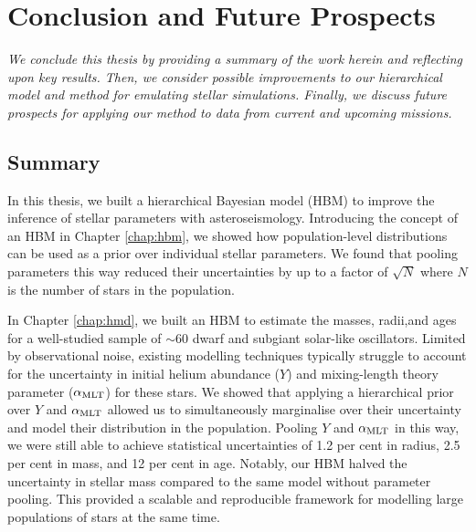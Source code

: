 %
%
%
%
%
\chapter{Conclusion and Future Prospects}

\textit{We conclude this thesis by providing a summary of the work herein and reflecting upon key results. Then, we consider possible improvements to our hierarchical model and method for emulating stellar simulations. Finally, we discuss future prospects for applying our method to data from current and upcoming missions.}

\section*{Summary}

In this thesis, we built a hierarchical Bayesian model (HBM) to improve the inference of stellar parameters with asteroseismology. Introducing the concept of an HBM in Chapter \ref{chap:hbm}, we showed how population-level distributions can be used as a prior over individual stellar parameters. We found that pooling parameters this way reduced their uncertainties by up to a factor of \(\sqrt{N}\) where \(N\) is the number of stars in the population.

In Chapter \ref{chap:hmd}, we built an HBM to estimate the masses, radii,and ages for a well-studied sample of \(\sim 60\) dwarf and subgiant solar-like oscillators. Limited by observational noise, existing modelling techniques typically struggle to account for the uncertainty in initial helium abundance (\(Y\)) and mixing-length theory parameter (\({\alpha_\mathrm{MLT}}\)) for these stars. We showed that applying a hierarchical prior over \(Y\) and \({\alpha_\mathrm{MLT}}\) allowed us to simultaneously marginalise over their uncertainty and model their distribution in the population. Pooling \(Y\) and \({\alpha_\mathrm{MLT}}\) in this way, we were still able to achieve statistical uncertainties of 1.2 per cent in radius, 2.5 per cent in mass, and 12 per cent in age. Notably, our HBM halved the uncertainty in stellar mass compared to the same model without parameter pooling. This provided a scalable and reproducible framework for modelling large populations of stars at the same time.

